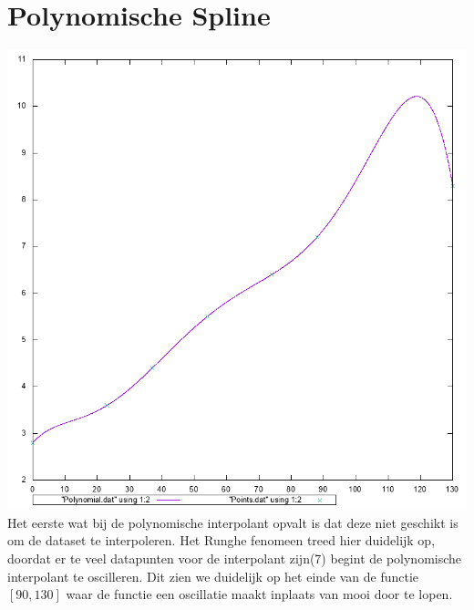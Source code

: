 \documentclass[10pt,a4paper]{article}
\begin{document}
\section{Polynomische Spline}
\includegraphics[scale=0.7]{Polynomial}
Het eerste wat bij de polynomische interpolant opvalt is dat deze niet geschikt is om de dataset te interpoleren. Het Runghe fenomeen treed hier duidelijk op, doordat er te veel datapunten voor de interpolant zijn(7) begint de polynomische interpolant te oscilleren. Dit zien we duidelijk op het einde van de functie $\left [ 90, 130 \right ]$ waar de functie een oscillatie maakt inplaats van mooi door te lopen.
\end{document}
